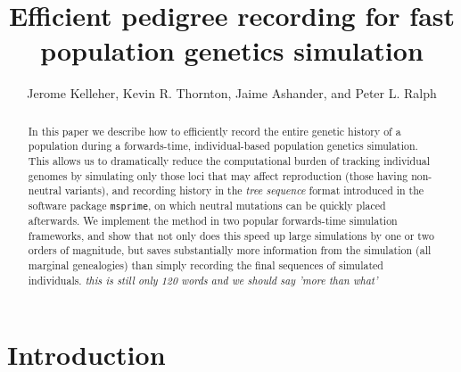 \documentclass{article}
\newcommand{\msprime}{\texttt{msprime}}
\newcommand{\jda}[1]{{\em \color{cyan} #1}}
\begin{document}
\title{Efficient pedigree recording for fast population genetics simulation}
\author{Jerome Kelleher,
        Kevin R. Thornton,
        Jaime Ashander, and
        Peter L. Ralph}
\maketitle



\begin{abstract}
    In this paper we describe how to
    efficiently record the entire genetic history of a population
    during a forwards-time, individual-based population genetics simulation.
    This allows us to dramatically reduce the computational burden of tracking individual genomes
    by simulating only those loci that may affect reproduction (those having non-neutral variants),
    and recording history in the \emph{tree sequence} format introduced in the software package \msprime,
    on which neutral mutations can be quickly placed afterwards.
    We implement the method in two popular forwards-time simulation frameworks,
    and show that not only does this speed up large simulations by one or two orders of magnitude,
    but saves substantially more information from the simulation
    (all marginal genealogies) than simply recording the final sequences of
    simulated individuals.
    \jda{ this is still only 120 words and we should say 'more than what'}
\end{abstract}



\section*{Introduction}
\end{document}
